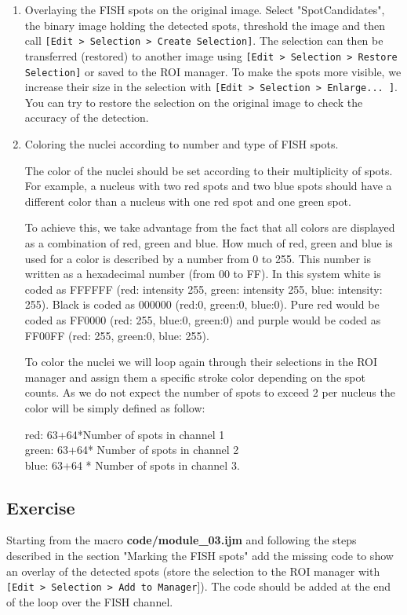 \documentclass[11pt,a4paper,oneside]{report}
\newcommand{\ijmenu}[1]{\texttt{\small#1}}
\begin{document}
\begin{enumerate}
    \item Overlaying the FISH spots on the original image.
    Select "SpotCandidates", the binary image holding the detected spots, threshold the image and then call \ijmenu{[Edit > Selection > Create Selection]}. The selection can then be transferred (restored) to another image using \ijmenu{[Edit > Selection > Restore Selection]} or saved to the ROI manager. To make the spots more visible, we increase their size in the selection with \ijmenu{[Edit > Selection > Enlarge... ]}. You can try to restore the selection on the original image to check the accuracy of the detection.

    \item Coloring the nuclei according to number and type of FISH spots.
    
    The color of the nuclei should be set according to their multiplicity of spots. For example, a nucleus with two red spots and two blue spots should have a different color than a nucleus with one red spot and one green spot.
    
    To achieve this, we take advantage from the fact that all colors are displayed as a combination of red, green and blue. How much of red, green and blue is used for a color is described by a number from 0 to 255. This number is written as a hexadecimal number (from 00 to FF). In this system white is coded as FFFFFF (red: intensity 255, green: intensity 255, blue: intensity: 255). Black is coded as 000000 (red:0, green:0, blue:0). Pure red would be coded as FF0000 (red: 255, blue:0, green:0) and purple would be coded as FF00FF (red: 255, green:0, blue: 255).
    
    To color the nuclei we will loop again through their selections in the ROI manager and assign them a specific stroke color depending on the spot counts. As we do not expect the number of spots to exceed 2 per nucleus the color will be simply defined as follow:
    
    red: 63+64*Number of spots in channel 1\\
    green: 63+64* Number of spots in channel 2\\
    blue: 63+64 * Number of spots in channel 3.
    
\end{enumerate}

\subsection{Exercise  }
Starting from the macro \textbf{code/module\_03.ijm} and following the steps described in the section "Marking the FISH spots" add the missing code to show an overlay of the detected spots (store the selection to the ROI manager with \ijmenu{[Edit > Selection > Add to Manager}]). The code should be added at the end of the loop over the FISH channel.
\end{document}
